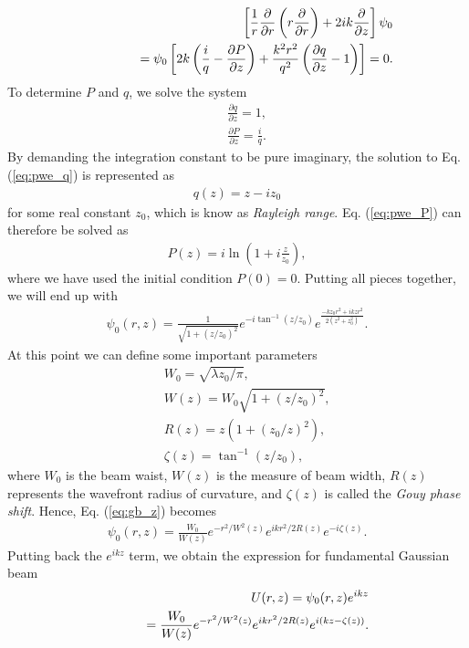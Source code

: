 {\begin{eqnarray}
	&& \left[ \frac{1}{r} \frac{\partial}{\partial r} \left( r \frac{\partial}{\partial r}\right) + 2ik \frac{\partial}{\partial z} \right] \psi_0
	\nonumber\\
	&&\hspace{0.5in} = \psi_0 \left[ 2k \left( \frac{i}{q} - \frac{\partial P}{\partial z} \right)
	+ \frac{k^2 r^2}{q^2} \left( \frac{\partial q}{\partial z} - 1 \right) \right] = 0.
	\nonumber
	\end{eqnarray}
	To determine $P$ and $q$, we solve the system
	\begin{eqnarray}
	&&\frac{\partial q}{\partial z} = 1,
	\label{eq:pwe_q}\\
	&&\frac{\partial P}{\partial z} = \frac{i}{q}.
	\label{eq:pwe_P}
\end{eqnarray}
By demanding the integration constant to be pure imaginary, the solution to Eq. (\ref{eq:pwe_q}) is represented as
\begin{eqnarray}
	q(z) = z - i z_0
\end{eqnarray}
for some real constant $z_0$, which is know as {\em Rayleigh range}. Eq. (\ref{eq:pwe_P}) can therefore be solved as
\begin{eqnarray}
	P(z) = i \ln (1 + i \frac{z}{z_0}),
\end{eqnarray}
where we have used the initial condition $P(0) = 0$. Putting all pieces together, we will end up with
\begin{eqnarray}
	\psi_0(r, z) = \frac{1}{\sqrt{1 + (z/z_0)^2}} e^{-i\tan^{-1} (z/z_0)} 
	e^{\frac{-k z_0 r^2 + i k z r^2}{2(z^2 + z_0^2)}}.
	\label{eq:gb_z}
\end{eqnarray}
At this point we can define some important parameters
\begin{eqnarray}
	&& W_0 = \sqrt{\lambda z_0/\pi},
	\nonumber\\
	&& W(z) = W_0 \sqrt{1 + (z/z_0)^2},
	\nonumber\\
	&& R(z) = z(1 + (z_0/z)^2),
	\nonumber\\
	&& \zeta(z) = \tan^{-1}(z/z_0),
	\nonumber
\end{eqnarray}
where $W_0$ is the beam waist, $W(z)$ is the measure of beam width, $R(z)$ represents the wavefront radius of curvature, and $\zeta(z)$ is called the {\em Gouy phase shift}. Hence, Eq. (\ref{eq:gb_z}) becomes
\begin{eqnarray}
	\psi_0(r, z) = \frac{W_0}{W(z)} e^{-r^2/W^2(z)} e^{i k r^2/ 2 R(z)} e^{-i \zeta(z)}.
	\nonumber
\end{eqnarray}
Putting back the $e^{ikz}$ term, we obtain the expression for fundamental Gaussian beam
\begin{eqnarray}
	&& U(r, z) = \psi_0(r, z) e^{ikz}
	\nonumber\\
	&& \hspace{0.3in} = \frac{W_0}{W(z)} e^{-r^2/W^2(z)} e^{i k r^2/ 2 R(z)} e^{i (kz - \zeta(z))}.
	\label{eq:gb}
\end{eqnarray}
}

